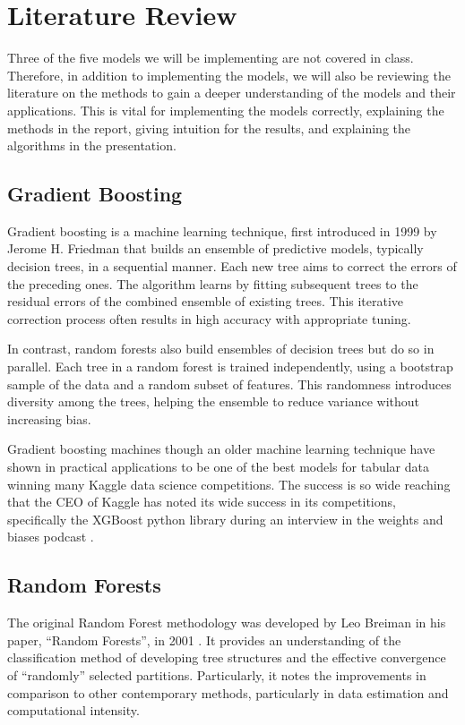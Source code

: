 \documentclass[10pt,twocolumn,letterpaper]{article}
\begin{document}
\section{Literature Review}
\label{sec:related}

Three of the five models we will be implementing are not covered in class.
Therefore, in addition to implementing the models, we will also be reviewing the literature on the methods to gain a deeper understanding of the models and their applications.
This is vital for implementing the models correctly, explaining the methods in the report, giving intuition for the results, and explaining the algorithms in the presentation.

\subsection{Gradient Boosting}

Gradient boosting is a machine learning technique, first introduced in 1999 by Jerome H. Friedman \cite{gradientboosting} that builds an ensemble of predictive models, typically decision trees, in a sequential manner.
Each new tree aims to correct the errors of the preceding ones.
The algorithm learns by fitting subsequent trees to the residual errors of the combined ensemble of existing trees.
This iterative correction process often results in high accuracy with appropriate tuning.

In contrast, random forests also build ensembles of decision trees but do so in parallel.
Each tree in a random forest is trained independently, using a bootstrap sample of the data and a random subset of features.
This randomness introduces diversity among the trees, helping the ensemble to reduce variance without increasing bias.

Gradient boosting machines though an older machine learning technique have shown in practical applications to be one of the best models for tabular data winning many Kaggle data science competitions.
The success is so wide reaching that the CEO of Kaggle has noted its wide success in its competitions, specifically the XGBoost \cite{xgboost} python library during an interview in the weights and biases podcast \cite{kaggle}.

\subsection{Random Forests}

The original Random Forest methodology was developed by Leo Breiman in his paper, “Random Forests”, in 2001 \cite{randomforest}.
It provides an understanding of the classification method of developing tree structures and the effective convergence of “randomly” selected partitions.
Particularly, it notes the improvements in comparison to other contemporary methods, particularly in data estimation and computational intensity.
\end{document}
